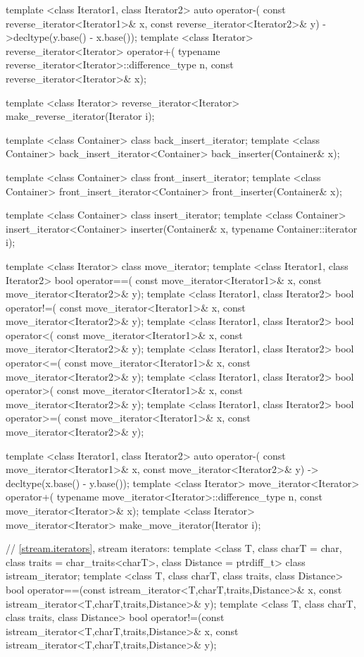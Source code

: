 \begin{codeblock}
{  template <class Iterator1, class Iterator2>
    auto operator-(
      const reverse_iterator<Iterator1>& x,
      const reverse_iterator<Iterator2>& y) ->decltype(y.base() - x.base());
  template <class Iterator>
    reverse_iterator<Iterator>
      operator+(
    typename reverse_iterator<Iterator>::difference_type n,
    const reverse_iterator<Iterator>& x);

  template <class Iterator>
    reverse_iterator<Iterator> make_reverse_iterator(Iterator i);    

  template <class Container> class back_insert_iterator;
  template <class Container>
    back_insert_iterator<Container> back_inserter(Container& x);

  template <class Container> class front_insert_iterator;
  template <class Container>
    front_insert_iterator<Container> front_inserter(Container& x);

  template <class Container> class insert_iterator;
  template <class Container>
    insert_iterator<Container> inserter(Container& x, typename Container::iterator i);

  template <class Iterator> class move_iterator;
  template <class Iterator1, class Iterator2>
    bool operator==(
      const move_iterator<Iterator1>& x, const move_iterator<Iterator2>& y);
  template <class Iterator1, class Iterator2>
    bool operator!=(
      const move_iterator<Iterator1>& x, const move_iterator<Iterator2>& y);
  template <class Iterator1, class Iterator2>
    bool operator<(
      const move_iterator<Iterator1>& x, const move_iterator<Iterator2>& y);
  template <class Iterator1, class Iterator2>
    bool operator<=(
      const move_iterator<Iterator1>& x, const move_iterator<Iterator2>& y);
  template <class Iterator1, class Iterator2>
    bool operator>(
      const move_iterator<Iterator1>& x, const move_iterator<Iterator2>& y);
  template <class Iterator1, class Iterator2>
    bool operator>=(
      const move_iterator<Iterator1>& x, const move_iterator<Iterator2>& y);

  template <class Iterator1, class Iterator2>
    auto operator-(
    const move_iterator<Iterator1>& x,
    const move_iterator<Iterator2>& y) -> decltype(x.base() - y.base());
  template <class Iterator>
    move_iterator<Iterator> operator+(
      typename move_iterator<Iterator>::difference_type n, const move_iterator<Iterator>& x);
  template <class Iterator>
    move_iterator<Iterator> make_move_iterator(Iterator i);

  // \ref{stream.iterators}, stream iterators:
  template <class T, class charT = char, class traits = char_traits<charT>,
      class Distance = ptrdiff_t>
  class istream_iterator;
  template <class T, class charT, class traits, class Distance>
    bool operator==(const istream_iterator<T,charT,traits,Distance>& x,
            const istream_iterator<T,charT,traits,Distance>& y);
  template <class T, class charT, class traits, class Distance>
    bool operator!=(const istream_iterator<T,charT,traits,Distance>& x,
            const istream_iterator<T,charT,traits,Distance>& y);

}
\end{codeblock}
